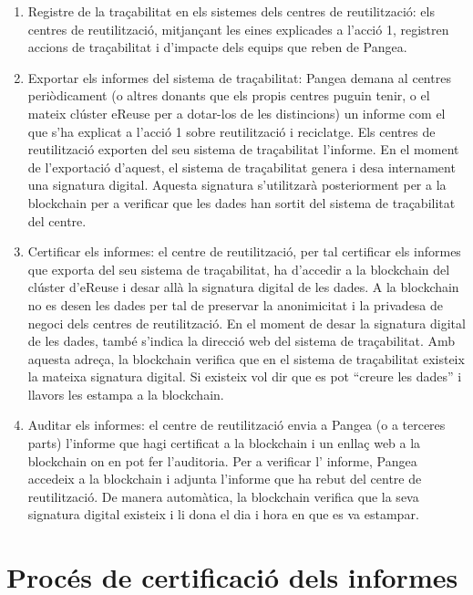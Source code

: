 \documentclass[
]{book}
\begin{document}
\begin{enumerate}
\def\labelenumi{\arabic{enumi}.}
\item
  Registre de la traçabilitat en els sistemes dels centres de reutilització: els centres de reutilització, mitjançant les eines explicades a l'acció 1, registren accions de traçabilitat i d'impacte dels equips que reben de Pangea.
\item
  Exportar els informes del sistema de traçabilitat: Pangea demana al centres periòdicament (o altres donants que els propis centres puguin tenir, o el mateix clúster eReuse per a dotar-los de les distincions) un informe com el que s'ha explicat a l'acció 1 sobre reutilització i reciclatge. Els centres de reutilització exporten del seu sistema de traçabilitat l'informe. En el moment de l'exportació d'aquest, el sistema de traçabilitat genera i desa internament una signatura digital. Aquesta signatura s'utilitzarà posteriorment per a la blockchain per a verificar que les dades han sortit del sistema de traçabilitat del centre.
\item
  Certificar els informes: el centre de reutilització, per tal certificar els informes que exporta del seu sistema de traçabilitat, ha d'accedir a la blockchain del clúster d'eReuse i desar allà la signatura digital de les dades. A la blockchain no es desen les dades per tal de preservar la anonimicitat i la privadesa de negoci dels centres de reutilització. En el moment de desar la signatura digital de les dades, també s'indica la direcció web del sistema de traçabilitat. Amb aquesta adreça, la blockchain verifica que en el sistema de traçabilitat existeix la mateixa signatura digital. Si existeix vol dir que es pot ``creure les dades'' i llavors les estampa a la blockchain.
\item
  Auditar els informes: el centre de reutilització envia a Pangea (o a terceres parts) l'informe que hagi certificat a la blockchain i un enllaç web a la blockchain on en pot fer l'auditoria. Per a verificar l' informe, Pangea accedeix a la blockchain i adjunta l'informe que ha rebut del centre de reutilització. De manera automàtica, la blockchain verifica que la seva signatura digital existeix i li dona el dia i hora en que es va estampar.
\end{enumerate}

\hypertarget{procuxe9s-de-certificaciuxf3-dels-informes}{%
\section{Procés de certificació dels informes}\label{procuxe9s-de-certificaciuxf3-dels-informes}}
\end{document}
